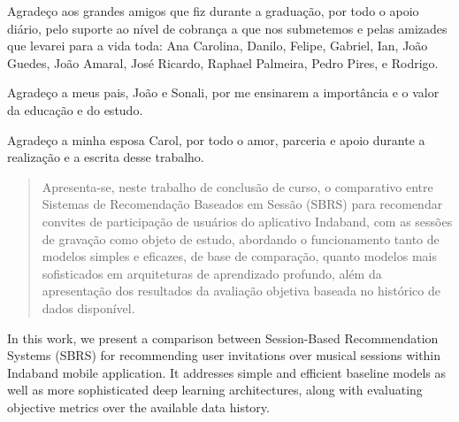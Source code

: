 \documentclass[tcc,numbers]{coppe}
\begin{document}
  Agradeço aos grandes amigos que fiz durante a graduação, por todo o apoio
  diário, pelo suporte ao nível de cobrança a que nos submetemos e pelas
  amizades que levarei para a vida toda: Ana Carolina, Danilo, Felipe, Gabriel,
  Ian, João Guedes, João Amaral, José Ricardo, Raphael Palmeira, Pedro Pires, e
  Rodrigo.

  Agradeço a meus pais, João e Sonali, por me ensinarem a importância e o valor
  da educação e do estudo.

  Agradeço a minha esposa Carol, por todo o amor, parceria e apoio durante a realização
  e a escrita desse trabalho.

  \begin{abstract}

  Apresenta-se, neste trabalho de conclusão de curso, o comparativo entre
 Sistemas de Recomendação Baseados em Sessão (SBRS)  para recomendar convites de
 participação de usuários do aplicativo Indaband, com as sessões de gravação
 como objeto de estudo, abordando o funcionamento tanto de modelos simples e
 eficazes, de base de comparação, quanto modelos mais sofisticados em
 arquiteturas de aprendizado profundo, além da apresentação dos resultados da
 avaliação objetiva baseada no histórico de dados disponível.
  \end{abstract}

  \begin{foreignabstract}

  
  In this work, we present a comparison between Session-Based Recommendation
  Systems (SBRS) for recommending user invitations over musical sessions within
  Indaband mobile application. It addresses simple and efficient baseline models
  as well as more sophisticated deep learning architectures, along with
  evaluating objective metrics over the available data history.

  \end{foreignabstract}

  \tableofcontents
  \listoffigures
  \listoftables
  \printlosymbols
  \printloabbreviations
  \mainmatter
  
\end{document}
